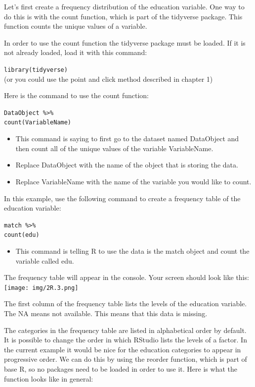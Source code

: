\documentclass[
]{book}
\providecommand{\tightlist}{%
  \setlength{\itemsep}{0pt}\setlength{\parskip}{0pt}}
\begin{document}
Let's first create a frequency distribution of the education variable. One way to do this is with the count function, which is part of the tidyverse package. This function counts the unique values of a variable.

In order to use the count function the tidyverse package must be loaded. If it is not already loaded, load it with this command:

\texttt{library(tidyverse)}\\
(or you could use the point and click method described in chapter 1)

Here is the command to use the count function:

\texttt{DataObject\ \%\textgreater{}\%}\\
\texttt{count(VariableName)}

\begin{itemize}
\tightlist
\item
  This command is saying to first go to the dataset named DataObject and then count all of the unique values of the variable VariableName.
\item
  Replace DataObject with the name of the object that is storing the data.
\item
  Replace VariableName with the name of the variable you would like to count.
\end{itemize}

In this example, use the following command to create a frequency table of the education variable:

\texttt{match\ \%\textgreater{}\%}\\
\texttt{count(edu)}

\begin{itemize}
\tightlist
\item
  This command is telling R to use the data is the match object and count the variable called edu.
\end{itemize}

The frequency table will appear in the console. Your screen should look like this:\\
\texttt{[image: img/2R.3.png]}

The first column of the frequency table lists the levels of the education variable. The NA means not available. This means that this data is missing.

The categories in the frequency table are listed in alphabetical order by default. It is possible to change the order in which RStudio lists the levels of a factor. In the current example it would be nice for the education categories to appear in progressive order. We can do this by using the reorder function, which is part of base R, so no packages need to be loaded in order to use it. Here is what the function looks like in general:
\end{document}

